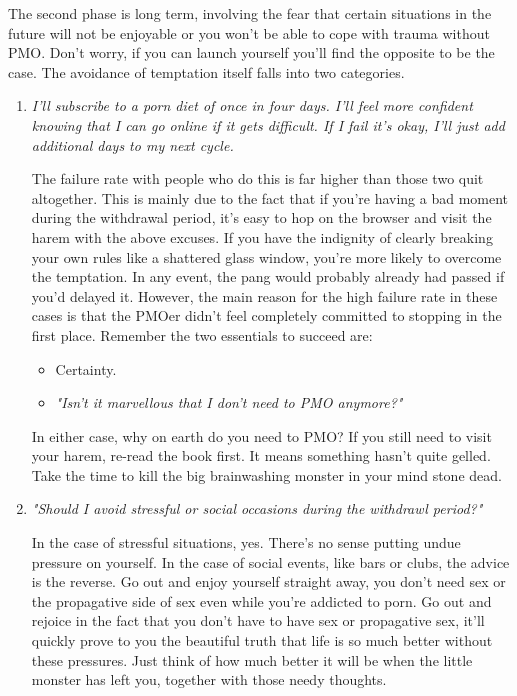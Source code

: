 \documentclass[easypeasy.tex]{subfiles}
\begin{document}
The second phase is long term, involving the fear that certain situations in the future will not be enjoyable or you won't be able to cope with trauma without PMO. Don't worry, if you can launch yourself you'll find the opposite to be the case. The avoidance of temptation itself falls into two categories.
  \begin{enumerate}
    \item \textit{I'll subscribe to a porn diet of once in four days. I'll feel more confident knowing that I can go online if it gets difficult. If I fail it's okay, I'll just add additional days to my next cycle.}

The failure rate with people who do this is far higher than those two quit altogether. This is mainly due to the fact that if you're having a bad moment during the withdrawal period, it's easy to hop on the browser and visit the harem with the above excuses. If you have the indignity of clearly breaking your own rules like a shattered glass window, you're more likely to overcome the temptation. In any event, the pang would probably already had passed if you'd delayed it. However, the main reason for the high failure rate in these cases is that the PMOer didn't feel completely committed to stopping in the first place. Remember the two essentials to succeed are:

\begin{itemize}
  \item Certainty.
  \item \textit{"Isn't it marvellous that I don't need to PMO anymore?"}
\end{itemize}

In either case, why on earth do you need to PMO? If you still need to visit your harem, re-read the book first. It means something hasn't quite gelled. Take the time to kill the big brainwashing monster in your mind stone dead.

  \item \textit{"Should I avoid stressful or social occasions during the withdrawl period?"}

In the case of stressful situations, yes. There's no sense putting undue pressure on yourself. In the case of social events, like bars or clubs, the advice is the reverse. Go out and enjoy yourself straight away, you don't need sex or the propagative side of sex even while you're addicted to porn. Go out and rejoice in the fact that you don't have to have sex or propagative sex, it'll quickly prove to you the beautiful truth that life is so much better without these pressures. Just think of how much better it will be when the little monster has left you, together with those needy thoughts.
\end{enumerate}
\end{document}
